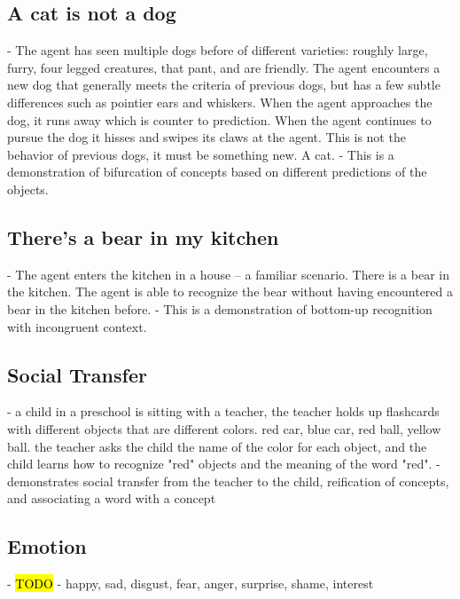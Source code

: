 \documentclass{article}
\begin{document}
\subsection{A cat is not a dog}
- The agent has seen multiple dogs before of different varieties: roughly large, furry, four legged creatures, that pant, and are friendly. The agent encounters a new dog that generally meets the criteria of previous dogs, but has a few subtle differences such as pointier ears and whiskers. When the agent approaches the dog, it runs away which is counter to prediction. When the agent continues to pursue the dog it hisses and swipes its claws at the agent. This is not the behavior of previous dogs, it must be something new. A cat. 
- This is a demonstration of bifurcation of concepts based on different predictions of the objects.

\subsection{There's a bear in my kitchen}
- The agent enters the kitchen in a house -- a familiar scenario. There is a bear in the kitchen. The agent is able to recognize the bear without having encountered a bear in the kitchen before. 
- This is a demonstration of bottom-up recognition with incongruent context.

\subsection{Social Transfer}
- a child in a preschool is sitting with a teacher, the teacher holds up flashcards with different objects that are different colors. red car, blue car, red ball, yellow ball. the teacher asks the child the name of the color for each object, and the child learns how to recognize "red" objects and the meaning of the word "red".
- demonstrates social transfer from the teacher to the child, reification of concepts, and associating a word with a concept

\subsection{Emotion}
- \hl{TODO}
- happy, sad, disgust, fear, anger, surprise, shame, interest
\end{document}
